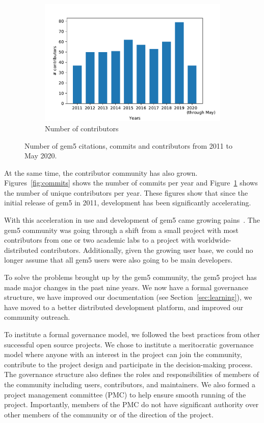 \begin{figure}
    \begin{subfigure}{0.28\linewidth}
      \centering
      \includegraphics[width=\linewidth]{fig/gem5_contributors}
      \caption{Number of contributors}
      \label{fig:contributors}
    \end{subfigure}
    \caption{Number of gem5 citations, commits and contributors from 2011 to May 2020.}
    \label{fig:gem5_citations_commits_contributors}
\end{figure}

At the same time, the contributor community has also grown.
Figures~\ref{fig:commits} shows the number of commits per year and Figure~\ref{fig:contributors} shows the number of unique contributors per year.
These figures show that since the initial release of gem5 in 2011, development has been significantly accelerating.

With this acceleration in use and development of gem5 came growing pains~\cite{Power-gem5horrors-2015}.
The gem5 community was going through a shift from a small project with most contributors from one or two academic labs to a project with worldwide-distributed contributors.
Additionally, given the growing user base, we could no longer assume that all gem5 users were also going to be main developers.

To solve the problems brought up by the gem5 community, the gem5 project has made major changes in the past nine years.
We now have a formal governance structure, we have improved our documentation (see Section~\ref{sec:learning}), we have moved to a better distributed development platform, and improved our community outreach.

To institute a formal governance model, we followed the best practices from other successful open source projects.
We chose to institute a meritocratic governance model where anyone with an interest in the project can join the community, contribute to the project design and participate in the decision-making process.
The governance structure also defines the roles and responsibilities of members of the community including users, contributors, and maintainers.
We also formed a project management committee (PMC) to help ensure smooth running of the project.
Importantly, members of the PMC do not have significant authority over other members of the community or of the direction of the project.

